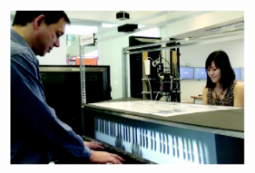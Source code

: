 \documentclass[manuscript,screen]{acmart}
\begin{document}
\begin{figure}
    \centering
    \includegraphics[width=7cm]{figures/xiaomrror2011.png}
    \caption{\cite{xiao2011duet} }
    \label{fig:xiaomirror2011}
\end{figure}



\end{document}
